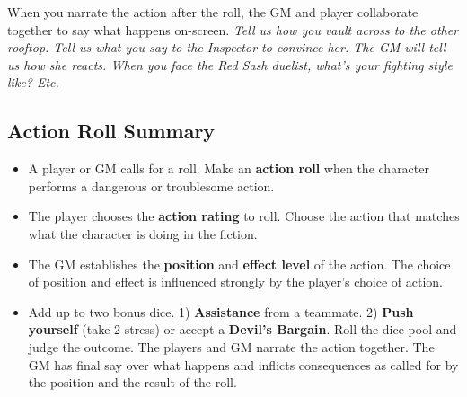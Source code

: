 When you narrate the action after the roll, the GM and player collaborate together to say what happens on-screen. \emph{Tell us how you vault across to the other rooftop. Tell us what you say to the Inspector to convince her. The GM will tell us how she reacts. When you face the Red Sash duelist, what’s your fighting style like? Etc.}

\subsection{Action Roll Summary}

\begin{itemize}
\item A player or GM calls for a roll. Make an \textbf{action roll} when the character performs a dangerous or troublesome action.
\item The player chooses the \textbf{action rating} to roll. Choose the action that matches what the character is doing in the fiction.
\item The GM establishes the \textbf{position} and \textbf{effect level} of the action. The choice of position and effect is influenced strongly by the player’s choice of action.
\item Add up to two bonus dice. 1) \textbf{Assistance} from a teammate. 2) \textbf{Push yourself} (take 2 stress) or accept a \textbf{Devil’s Bargain}.
    Roll the dice pool and judge the outcome. The players and GM narrate the action together. The GM has final say over what happens and inflicts consequences as called for by the position and the result of the roll.
\end{itemize}

